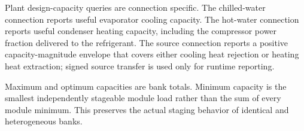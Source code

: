 Plant design-capacity queries are connection specific. The chilled-water connection reports useful evaporator cooling capacity. The hot-water connection reports useful condenser heating capacity, including the compressor power fraction delivered to the refrigerant. The source connection reports a positive capacity-magnitude envelope that covers either cooling heat rejection or heating heat extraction; signed source transfer is used only for runtime reporting.

Maximum and optimum capacities are bank totals. Minimum capacity is the smallest independently stageable module load rather than the sum of every module minimum. This preserves the actual staging behavior of identical and heterogeneous banks.
